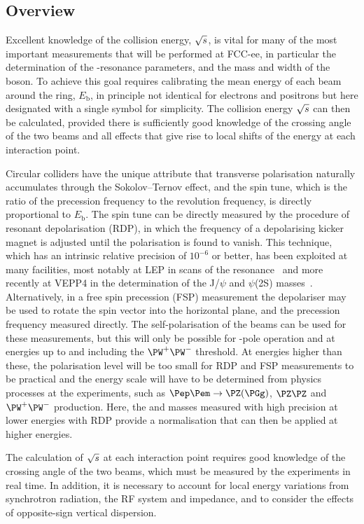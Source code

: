 \subsection{Overview}

Excellent knowledge of the collision energy, $\sqrt{s}$, is vital for many of the most important measurements that will be performed at FCC-ee, in particular the determination of the \PZ-resonance parameters, and the mass and width of the \PW boson.
To achieve this goal requires calibrating the mean energy of each beam  around the ring, $E_\mathrm{b}$, in principle not identical for electrons and positrons but here designated with a single symbol for simplicity. 
The collision energy $\sqrt{s}$ can then be calculated, provided there is sufficiently good knowledge of the crossing angle of the two beams and all effects that give rise to local shifts of the energy at each interaction point. 

Circular colliders have the unique attribute that transverse polarisation naturally accumulates through the Sokolov--Ternov effect, and the spin tune, which is the ratio of the precession frequency to the revolution frequency, is directly proportional to $E_\mathrm{b}$. 
The spin tune can be directly measured by the procedure of resonant depolarisation (RDP), in which the frequency of a depolarising kicker magnet is adjusted until the polarisation is found to vanish. 
This technique, which has an intrinsic relative precision of $10^{-6}$ or better, has been exploited at many facilities, 
most notably at LEP in scans of the \PZ resonance~\cite{Assmann:1998qb} and more recently at VEPP4 in the determination of the J/$\psi$ and $\psi$(2S) masses~\cite{ANASHIN201550}. 
Alternatively, in a free spin precession (FSP) measurement the depolariser may be used to rotate the spin vector into the horizontal plane, and the precession frequency measured directly. 
The self-polarisation of the beams can be used for these measurements, but this will only be possible for \PZ-pole operation and at energies up to and including the $\PW^+\PW^-$ threshold. 
At energies higher than these, the polarisation level will be too small for RDP and FSP measurements to be practical and the energy scale will have to be determined from physics processes at the experiments, such as $\Pep\Pem \to \PZ (\PGg)$, $\PZ\PZ$ and $\PW^+\PW^-$ production. 
Here, the \PZ and \PW masses measured with high precision at lower energies with RDP
provide a normalisation that can then be applied at higher energies. 

The calculation of $\sqrt{s}$ at each interaction point requires good knowledge of the crossing angle of the two beams, which must be measured by the experiments in real time.  
In addition, it is necessary to account for local energy variations from synchrotron radiation, the RF system and impedance, and to consider the effects of opposite-sign vertical dispersion.

